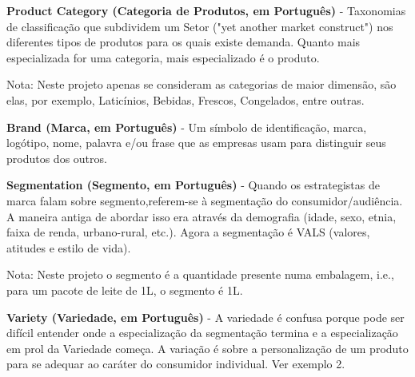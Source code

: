 
\vspace{0.2cm}
\textbf{Product Category (Categoria de Produtos, em Português)} - Taxonomias de classificação que subdividem um Setor ("yet another market construct") nos diferentes tipos de produtos para os quais existe demanda. Quanto mais especializada for uma categoria, mais especializado é o produto. 

{\footnotesize Nota: Neste projeto apenas se consideram as categorias de maior dimensão, são elas, por exemplo, Laticínios, Bebidas, Frescos, Congelados, entre outras.}


\vspace{0.2cm}
\textbf{Brand (Marca, em Português)} - Um símbolo de identificação, marca, logótipo, nome, palavra e/ou frase que as empresas usam para distinguir seus produtos dos outros.

 
\vspace{0.2cm}
\textbf{Segmentation (Segmento, em Português)} - Quando os estrategistas de marca falam sobre segmento,referem-se à segmentação do consumidor/audiência. A maneira antiga de abordar isso era através da demografia (idade, sexo, etnia, faixa de renda, urbano-rural, etc.). Agora a segmentação é VALS (valores, atitudes e estilo de vida). 

{\footnotesize Nota: Neste projeto o segmento é a quantidade presente numa embalagem, i.e., para um pacote de leite de 1L, o segmento é 1L.}


\vspace{0.2cm}
\textbf{Variety (Variedade, em Português)} - A variedade é confusa porque pode ser difícil entender onde a especialização da segmentação termina e a especialização em prol da Variedade começa. A variação é sobre a personalização de um produto para se adequar ao caráter do consumidor individual. Ver exemplo 2.

\vspace{0.5cm}




